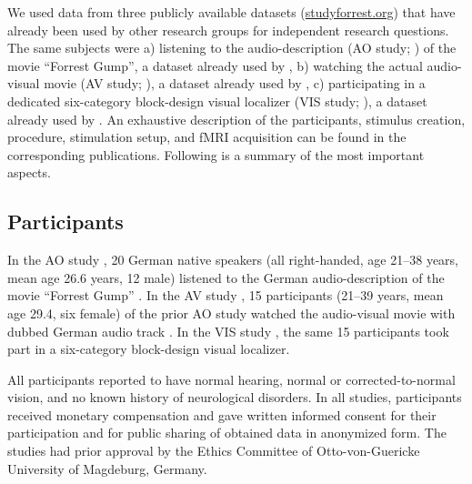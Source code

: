 \documentclass[english]{article}
\begin{document}

We used data from three publicly available datasets
(\href{http://www.studyforrest.org}{studyforrest.org}) that have already been
used by other research groups for independent research questions.
The same subjects were
a) listening to the audio-description (AO study; \citep{hanke2014audiomovie}) of
the movie ``Forrest Gump'', a dataset already used by \citep{hu2017decoding,
nguyen2016integration},
b) watching the actual audio-visual movie (AV study;
\citep{hanke2016simultaneous}), a dataset already used by
\citep{ben2018hippocampal},
c) participating in a dedicated six-category block-design visual localizer (VIS
study; \citep{sengupta2016extension}), a dataset already used by
\citep{jiahui2019predicting}.
An exhaustive description of the participants, stimulus creation, procedure,
stimulation setup, and fMRI acquisition can be found in the corresponding
publications. Following is a summary of the most important aspects.


\subsection{Participants}
In the AO study \citep{hanke2014audiomovie}, 20 German native speakers (all
right-handed, age 21–38 years, mean age 26.6 years, 12 male) listened to the
German audio-description \citep{ForrestGumpGermanAD} of the movie ``Forrest
Gump'' \citep{ForrestGumpMovie}.
In the AV study \citep{hanke2016simultaneous}, 15 participants (21–39 years,
mean age 29.4, six female) of the prior AO study watched the audio-visual movie
with dubbed German audio track \citep{ForrestGumpDVD}.
In the VIS study \citep{sengupta2016extension}, the same 15 participants took
part in a six-category block-design visual localizer.

All participants reported to have normal hearing, normal or corrected-to-normal
vision, and no known history of neurological disorders.
In all studies, participants received monetary compensation and gave written
informed consent for their participation and for public sharing of obtained data
in anonymized form. The studies had prior approval by the Ethics Committee of
Otto-von-Guericke University of Magdeburg, Germany.
\end{document}
